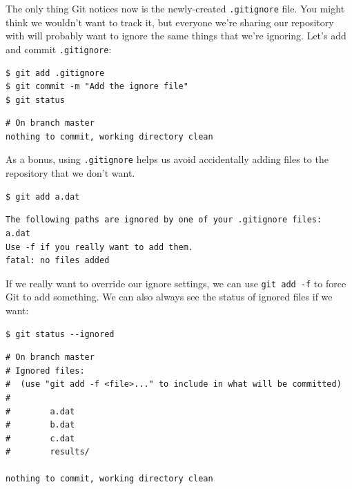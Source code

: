 \documentclass{book}
\begin{document}
The only thing Git notices now is the newly-created \texttt{.gitignore}
file. You might think we wouldn't want to track it, but everyone we're
sharing our repository with will probably want to ignore the same things
that we're ignoring. Let's add and commit \texttt{.gitignore}:

\begin{verbatim}
$ git add .gitignore
$ git commit -m "Add the ignore file"
$ git status
\end{verbatim}

\begin{verbatim}
# On branch master
nothing to commit, working directory clean
\end{verbatim}

As a bonus, using \texttt{.gitignore} helps us avoid accidentally adding
files to the repository that we don't want.

\begin{verbatim}
$ git add a.dat
\end{verbatim}

\begin{verbatim}
The following paths are ignored by one of your .gitignore files:
a.dat
Use -f if you really want to add them.
fatal: no files added
\end{verbatim}

If we really want to override our ignore settings, we can use
\texttt{git add -f} to force Git to add something. We can also always
see the status of ignored files if we want:

\begin{verbatim}
$ git status --ignored
\end{verbatim}

\begin{verbatim}
# On branch master
# Ignored files:
#  (use "git add -f <file>..." to include in what will be committed)
#
#        a.dat
#        b.dat
#        c.dat
#        results/

nothing to commit, working directory clean
\end{verbatim}
\end{document}
